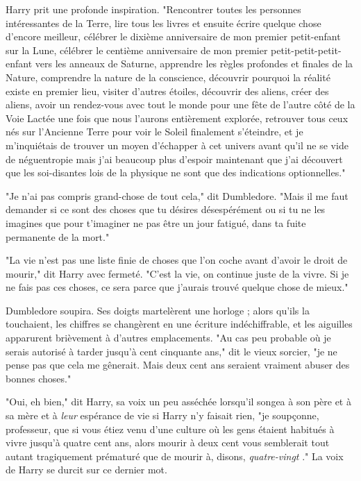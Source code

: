 Harry prit une profonde inspiration. "Rencontrer toutes les personnes intéressantes de la Terre, lire tous les livres et ensuite écrire quelque chose d'encore meilleur, célébrer le dixième anniversaire de mon premier petit-enfant sur la Lune, célébrer le centième anniversaire de mon premier petit-petit-petit-enfant vers les anneaux de Saturne, apprendre les règles profondes et finales de la Nature, comprendre la nature de la conscience, découvrir pourquoi la réalité existe en premier lieu, visiter d'autres étoiles, découvrir des aliens, créer des aliens, avoir un rendez-vous avec tout le monde pour une fête de l'autre côté de la Voie Lactée une fois que nous l'aurons entièrement explorée, retrouver tous ceux nés sur l'Ancienne Terre pour voir le Soleil finalement s'éteindre, et je m'inquiétais de trouver un moyen d'échapper à cet univers avant qu'il ne se vide de néguentropie mais j'ai beaucoup plus d'espoir maintenant que j'ai découvert que les soi-disantes lois de la physique ne sont que des indications optionnelles."

"Je n'ai pas compris grand-chose de tout cela," dit Dumbledore. "Mais il me faut demander si ce sont des choses que tu désires désespérément ou si tu ne les imagines que pour t'imaginer ne pas être un jour fatigué, dans ta fuite permanente de la mort."

"La vie n'est pas une liste finie de choses que l'on coche avant d'avoir le droit de mourir," dit Harry avec fermeté. "C'est la vie, on continue juste de la vivre. Si je ne fais pas ces choses, ce sera parce que j'aurais trouvé quelque chose de mieux."

Dumbledore soupira. Ses doigts martelèrent une horloge ; alors qu'ils la touchaient, les chiffres se changèrent en une écriture indéchiffrable, et les aiguilles apparurent brièvement à d'autres emplacements. "Au cas peu probable où je serais autorisé à tarder jusqu'à cent cinquante ans," dit le vieux sorcier, "je ne pense pas que cela me gênerait. Mais deux cent ans seraient vraiment abuser des bonnes choses."

"Oui, eh bien," dit Harry, sa voix un peu asséchée lorsqu'il songea à son père et à sa mère et à \emph{leur}  espérance de vie si Harry n'y faisait rien, "je soupçonne, professeur, que si vous étiez venu d'une culture où les gens étaient habitués à vivre jusqu'à quatre cent ans, alors mourir à deux cent vous semblerait tout autant tragiquement prématuré que de mourir à, disons, \emph{quatre-vingt} ." La voix de Harry se durcit sur ce dernier mot.

